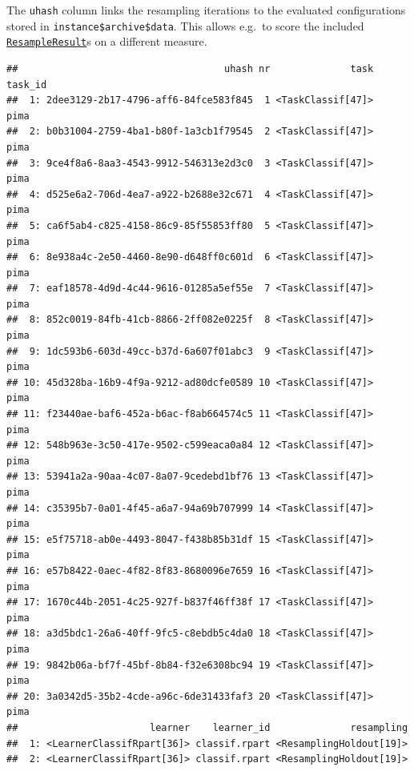 \documentclass[
]{scrbook}
\newenvironment{Shaded}{\begin{snugshade}}{\end{snugshade}}
\newcommand{\FunctionTok}[1]{\textcolor[rgb]{0.00,0.00,0.00}{#1}}
\newcommand{\NormalTok}[1]{#1}
\newcommand{\SpecialCharTok}[1]{\textcolor[rgb]{0.00,0.00,0.00}{#1}}
\newcommand{\StringTok}[1]{\textcolor[rgb]{0.31,0.60,0.02}{#1}}
\renewenvironment{Shaded} {\begin{snugshade}\small} {\end{snugshade}}
\begin{document}
The \texttt{uhash} column links the resampling iterations to the evaluated configurations stored in \texttt{instance\$archive\$data}. This allows e.g.~to score the included \href{https://mlr3.mlr-org.com/reference/ResampleResult.html}{\texttt{ResampleResult}}s on a different measure.

\begin{Shaded}
\end{Shaded}

\begin{verbatim}
##                                    uhash nr              task task_id
##  1: 2dee3129-2b17-4796-aff6-84fce583f845  1 <TaskClassif[47]>    pima
##  2: b0b31004-2759-4ba1-b80f-1a3cb1f79545  2 <TaskClassif[47]>    pima
##  3: 9ce4f8a6-8aa3-4543-9912-546313e2d3c0  3 <TaskClassif[47]>    pima
##  4: d525e6a2-706d-4ea7-a922-b2688e32c671  4 <TaskClassif[47]>    pima
##  5: ca6f5ab4-c825-4158-86c9-85f55853ff80  5 <TaskClassif[47]>    pima
##  6: 8e938a4c-2e50-4460-8e90-d648ff0c601d  6 <TaskClassif[47]>    pima
##  7: eaf18578-4d9d-4c44-9616-01285a5ef55e  7 <TaskClassif[47]>    pima
##  8: 852c0019-84fb-41cb-8866-2ff082e0225f  8 <TaskClassif[47]>    pima
##  9: 1dc593b6-603d-49cc-b37d-6a607f01abc3  9 <TaskClassif[47]>    pima
## 10: 45d328ba-16b9-4f9a-9212-ad80dcfe0589 10 <TaskClassif[47]>    pima
## 11: f23440ae-baf6-452a-b6ac-f8ab664574c5 11 <TaskClassif[47]>    pima
## 12: 548b963e-3c50-417e-9502-c599eaca0a84 12 <TaskClassif[47]>    pima
## 13: 53941a2a-90aa-4c07-8a07-9cedebd1bf76 13 <TaskClassif[47]>    pima
## 14: c35395b7-0a01-4f45-a6a7-94a69b707999 14 <TaskClassif[47]>    pima
## 15: e5f75718-ab0e-4493-8047-f438b85b31df 15 <TaskClassif[47]>    pima
## 16: e57b8422-0aec-4f82-8f83-8680096e7659 16 <TaskClassif[47]>    pima
## 17: 1670c44b-2051-4c25-927f-b837f46ff38f 17 <TaskClassif[47]>    pima
## 18: a3d5bdc1-26a6-40ff-9fc5-c8ebdb5c4da0 18 <TaskClassif[47]>    pima
## 19: 9842b06a-bf7f-45bf-8b84-f32e6308bc94 19 <TaskClassif[47]>    pima
## 20: 3a0342d5-35b2-4cde-a96c-6de31433faf3 20 <TaskClassif[47]>    pima
##                       learner    learner_id              resampling
##  1: <LearnerClassifRpart[36]> classif.rpart <ResamplingHoldout[19]>
##  2: <LearnerClassifRpart[36]> classif.rpart <ResamplingHoldout[19]>

\end{verbatim}
\end{document}
